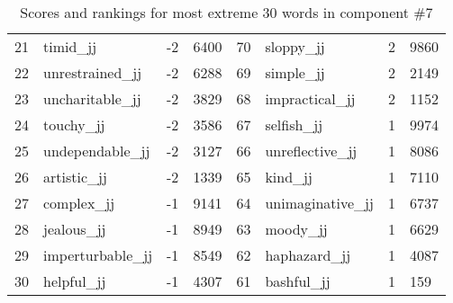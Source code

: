 \begin{table}[tbp]
\begin{tabular}{| rlr@{.}l | rlr@{.}l |}
    21 & timid\_jj & -2 & 6400    &    70 & sloppy\_jj & 2 & 9860 \\
    22 & unrestrained\_jj & -2 & 6288    &    69 & simple\_jj & 2 & 2149 \\
    23 & uncharitable\_jj & -2 & 3829    &    68 & impractical\_jj & 2 & 1152 \\
    24 & touchy\_jj & -2 & 3586    &    67 & selfish\_jj & 1 & 9974 \\
    25 & undependable\_jj & -2 & 3127    &    66 & unreflective\_jj & 1 & 8086 \\
    26 & artistic\_jj & -2 & 1339    &    65 & kind\_jj & 1 & 7110 \\
    27 & complex\_jj & -1 & 9141    &    64 & unimaginative\_jj & 1 & 6737 \\
    28 & jealous\_jj & -1 & 8949    &    63 & moody\_jj & 1 & 6629 \\
    29 & imperturbable\_jj & -1 & 8549    &    62 & haphazard\_jj & 1 & 4087 \\
    30 & helpful\_jj & -1 & 4307    &    61 & bashful\_jj & 1 & 159 \\
    \hline
    \end{tabular}
    \caption{Scores and rankings for most extreme 30 words in component \#7} 
\end{table}
\clearpage
